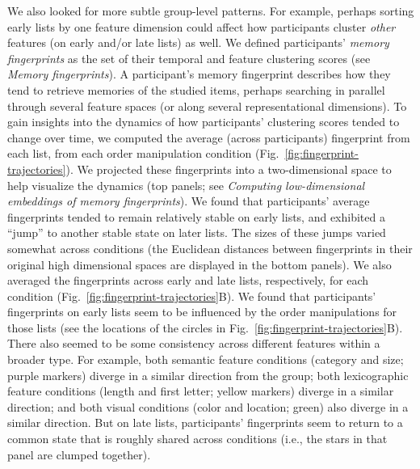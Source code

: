 \documentclass[11pt]{article}
\begin{document}
We also looked for more subtle group-level patterns. For example, perhaps
sorting early lists by one feature dimension could affect how participants
cluster \textit{other} features (on early and/or late lists) as well. We
defined participants' \textit{memory fingerprints} as the set of their temporal
and feature clustering scores (see \textit{Memory fingerprints}). A
participant's memory fingerprint describes how they tend to retrieve memories
of the studied items, perhaps searching in parallel through several feature
spaces (or along several representational dimensions). To gain insights into
the dynamics of how participants' clustering scores tended to change over time,
we computed the average (across participants) fingerprint from each list, from
each order manipulation condition (Fig.~\ref{fig:fingerprint-trajectories}). We
projected these fingerprints into a two-dimensional space to help visualize the
dynamics (top panels; see \textit{Computing low-dimensional embeddings of
memory fingerprints}). We found that participants' average fingerprints tended
to remain relatively stable on early lists, and exhibited a ``jump'' to another
stable state on later lists. The sizes of these jumps varied somewhat across
conditions (the Euclidean distances between fingerprints in their original high
dimensional spaces are displayed in the bottom panels). We also averaged the
fingerprints across early and late lists, respectively, for each condition
(Fig.~\ref{fig:fingerprint-trajectories}B). We found that participants'
fingerprints on early lists seem to be influenced by the order manipulations
for those lists (see the locations of the circles in
Fig.~\ref{fig:fingerprint-trajectories}B). There also seemed to be some
consistency across different features within a broader type. For example, both
semantic feature conditions (category and size; purple markers) diverge in a
similar direction from the group; both lexicographic feature conditions (length
and first letter; yellow markers) diverge in a similar direction; and both
visual conditions (color and location; green) also diverge in a similar
direction. But on late lists, participants' fingerprints seem to return to a
common state that is roughly shared across conditions (i.e., the stars in that
panel are clumped together).
\end{document}
